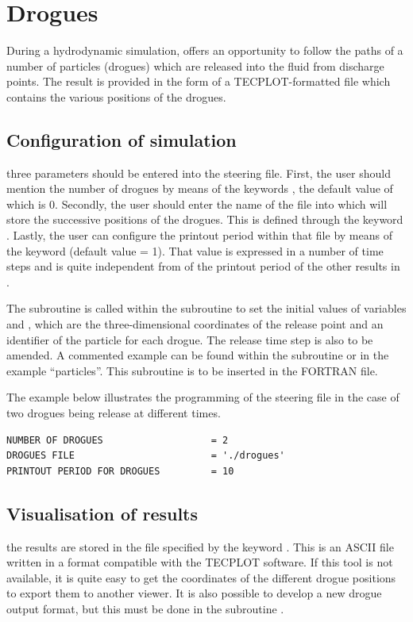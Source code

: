 \chapter{Drogues}
\label{sec:drogues}

During a hydrodynamic simulation,  offers an opportunity to follow
the paths of a number of particles (drogues) which are released into the fluid
from discharge points. The result is provided in the form of a
TECPLOT-formatted file which contains the various positions of the drogues.


\section{Configuration of simulation}

three parameters should be entered into the steering file. First, the user
should mention the number of drogues by means of the keywords , the default value of which is 0. Secondly, the user should enter the
name of the file into which  will store the successive positions of
the drogues. This is defined through the keyword . Lastly,
the user can configure the printout period within that file by means of the
keyword  (default value = 1). That value is
expressed in a number of time steps and is quite independent from of the
printout period of the other results in .

The subroutine  is called within the 
subroutine to set the initial values of variables 
and , which are the three-dimensional coordinates of the
release point and an identifier of the particle for each drogue.
The release time step is also to be amended.
A commented example can be found within the subroutine  or
in the example ``particles''.
This subroutine is to be inserted in the FORTRAN file.

The example below illustrates the programming of the steering file in the case
of two drogues being release at different times.

\begin{lstlisting}[language=TelemacCas]
NUMBER OF DROGUES                   = 2
DROGUES FILE                        = './drogues'
PRINTOUT PERIOD FOR DROGUES         = 10
\end{lstlisting}

\section{Visualisation of results}
\label{sec:droguesfile}
the results are stored in the file specified by the keyword . This is an ASCII file written in a format compatible with
the TECPLOT software. If this tool is not available, it is quite easy to get
the coordinates of the different drogue positions to export them to another
viewer. It is also possible to develop a new drogue output format, but this
must be done in the subroutine .

